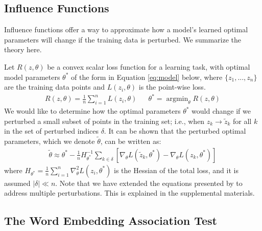 \documentclass{article}
\DeclareMathOperator*{\argmin}{argmin}
\begin{document}
\subsection{Influence Functions} \label{Influence}
Influence functions offer a way to approximate how a model's learned optimal parameters will change if the training data is perturbed.
We summarize the theory here.

Let $R(z, \theta)$ be a convex scalar loss function for a learning task, with optimal model parameters $\theta^*$ of the form in Equation \eqref{eq:model} below, where $\{z_1, ... , z_n\}$ are the training data points and $L(z_i, \theta)$ is the point-wise loss.
\begin{align}\label{eq:model}
R(z, \theta) = \frac{1}{n} \sum_{i=1}^n L(z_i, \theta) && \theta^* = \argmin_{\theta} R(z, \theta)
\end{align}
We would like to determine how the optimal parameters $\theta^*$ would change if we perturbed a small subset of points in the training set; i.e., when $z_k \rightarrow \tilde{z}_k$ for all $k$ in the set of perturbed indices $\delta$. It can be shown that the perturbed optimal parameters, which we denote $\tilde{\theta}$, can be written as:
\begin{align}\label{eq:influence}
\tilde{\theta} \approx \theta^* - \frac{1}{n} H_{\theta^*} ^{-1} \sum_{k\in\delta}\left[\nabla_{\theta} L(\tilde{z}_k, \theta^*) - \nabla_{\theta} L(z_k, \theta^*)\right]
\end{align}
where $H_{\theta^*} = \frac{1}{n}\sum_{i=1}^n \nabla_{\theta}^2 L(z_i,\theta^*)$ is the Hessian of the total loss, and it is assumed $|\delta| \ll n$. 
Note that we have extended the equations presented by \citet{Influence} to address multiple perturbations.
This is explained in the supplemental materials. 

\subsection{The Word Embedding Association Test}\label{SecWEAT}

\end{document}
